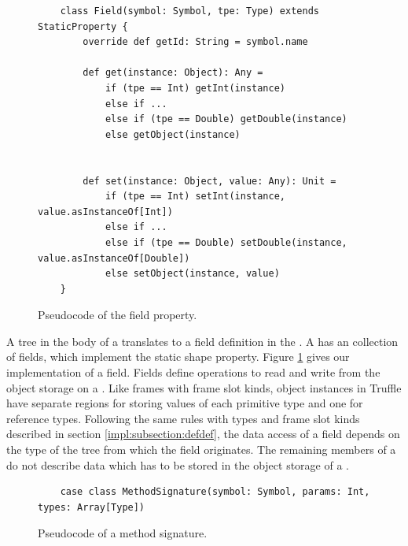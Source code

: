 \begin{figure}[!htb]
	\begin{verbatim}
	class Field(symbol: Symbol, tpe: Type) extends StaticProperty {
		override def getId: String = symbol.name
			
		def get(instance: Object): Any = 
			if (tpe == Int) getInt(instance)
			else if ...
			else if (tpe == Double) getDouble(instance)
			else getObject(instance)
	
			
		def set(instance: Object, value: Any): Unit = 
			if (tpe == Int) setInt(instance, value.asInstanceOf[Int])
			else if ...
			else if (tpe == Double) setDouble(instance, value.asInstanceOf[Double])
			else setObject(instance, value)	
	} 
	\end{verbatim}
	\caption{Pseudocode of the field property.}
	\label{impl:field}
\end{figure}

A  tree in the body of a  translates to a field definition in the .
A  has an collection of fields, which implement the static shape property.
Figure \ref{impl:field} gives our implementation of a field.
Fields define operations to read and write from the object storage on a .
Like frames with frame slot kinds, object instances in Truffle have separate regions for storing values of each primitive type and one for reference types.
Following the same rules with types and frame slot kinds described in section \ref{impl:subsection:defdef}, the data access of a field depends on the type of the  tree from which the field originates.
The remaining members of a  do not describe data which has to be stored in the object storage of a .

\begin{figure}[!htb]
	\begin{verbatim}
	case class MethodSignature(symbol: Symbol, params: Int, types: Array[Type])
	\end{verbatim}
	\caption{Pseudocode of a method signature.}
	\label{impl:method-signature}
\end{figure}

